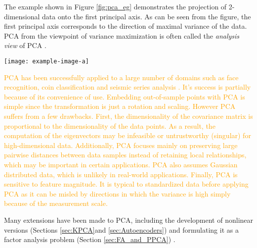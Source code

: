 The example shown in Figure \ref{fig:pca_eg} demonstrates the projection of 2-dimensional data onto the first principal axis.  As can be seen from the figure, the first principal axis corresponds to the direction of maximal variance of the data.  PCA from the viewpoint of variance maximization is often called the \textit{analysis view} of PCA \citep{Murphy2012}.
\begin{center}
	\begin{figure*}[t]
		\centering
		\texttt{[image: example-image-a]}
		\caption[PCA example.]{Placeholder for PCA projection example.}
		\label{fig:pca_eg}
	\end{figure*}
\end{center}
\textcolor{orange}{PCA has been successfully applied to a large  number of domains such as face recognition, coin classification and seismic series analysis \citep{VanDerMaaten2009DRReview}. It's success is partially because of its convenience of use.  Embedding out-of-sample points with PCA is simple since the transformation is just a rotation and scaling. However PCA suffers from a few drawbacks.  First, the dimensionality of the covariance matrix is proportional to the dimensionality of the data points.  As a result, the computation of the eigenvectors may be infeasible or untrustworthy (singular) for high-dimensional data.  Additionally, PCA focuses mainly on preserving large pairwise distances between data samples instead of retaining local relationships, which may be important in certain applications.  PCA also assumes Gaussian distributed data, which is unlikely in real-world applications. Finally, PCA is sensitive to feature magnitude. It is typical to standardized data before applying PCA as it can be misled by directions in which the variance is high simply because of the measurement scale.}

Many extensions have been made to PCA, including the development of nonlinear versions (Sections \ref{sec:KPCA}and \ref{sec:Autoencoders}) \citep{Scholkopf1999KPCA, Scholz2008NonlinearPCA} and formulating it as a factor analysis problem (Section \ref{sec:FA_and_PPCA}) \citep{Tipping1999PPCA}. 

